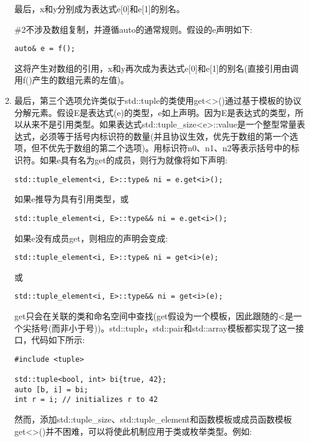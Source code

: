 \begin{enumerate}
最后，x和y分别成为表达式e[0]和e[1]的别名。

\#2不涉及数组复制，并遵循auto的通常规则。假设的e声明如下:

\begin{lstlisting}[style=styleCXX]
auto& e = f();
\end{lstlisting}

这将产生对数组的引用，x和y再次成为表达式e[0]和e[1]的别名(直接引用由调用f()产生的数组元素的左值)。

\item
最后，第三个选项允许类似于std::tuple的类使用get<>()通过基于模板的协议分解元素。假设E是表达式(e)的类型，e如上声明。因为E是表达式的类型，所以从来不是引用类型。如果表达式std::tuple\_size<e>::value是一个整型常量表达式，必须等于括号内标识符的数量(并且协议生效，优先于数组的第一个选项，但不优先于数组的第二个选项)。用标识符n0、n1、n2等表示括号中的标识符。如果e具有名为get的成员，则行为就像将如下声明:

\begin{lstlisting}[style=styleCXX]
std::tuple_element<i, E>::type& ni = e.get<i>();
\end{lstlisting}

如果e推导为具有引用类型，或

\begin{lstlisting}[style=styleCXX]
std::tuple_element<i, E>::type&& ni = e.get<i>();
\end{lstlisting}

如果e没有成员get，则相应的声明会变成:

\begin{lstlisting}[style=styleCXX]
std::tuple_element<i, E>::type& ni = get<i>(e);
\end{lstlisting}

或

\begin{lstlisting}[style=styleCXX]
std::tuple_element<i, E>::type&& ni = get<i>(e);
\end{lstlisting}

get只会在关联的类和命名空间中查找(get假设为一个模板，因此跟随的<是一个尖括号(而非小于号))。std::tuple，std::pair和std::array模板都实现了这一接口，代码如下所示:

\begin{lstlisting}[style=styleCXX]
#include <tuple>

std::tuple<bool, int> bi{true, 42};
auto [b, i] = bi;
int r = i; // initializes r to 42
\end{lstlisting}

然而，添加std::tuple\_size、std::tuple\_element和函数模板或成员函数模板get<>()并不困难，可以将使此机制应用于类或枚举类型。例如:


\end{enumerate}
